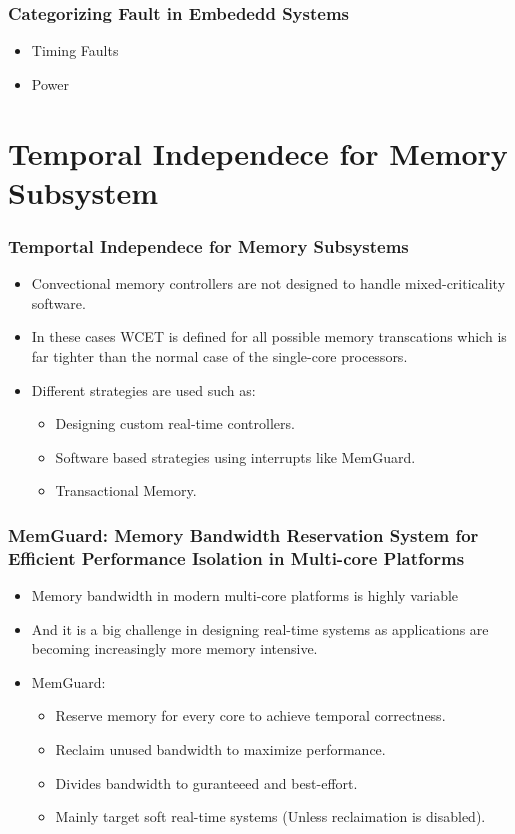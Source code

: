 \documentclass{beamer}
\begin{document}
\begin{frame}
    \frametitle{Categorizing Fault in Embededd Systems}
    \begin{itemize}
        \item Timing Faults
        \item Power
    \end{itemize}
\end{frame}
\section{Temporal Independece for Memory Subsystem}
\begin{frame}
    \frametitle{Temportal Independece for Memory Subsystems}
    \begin{itemize}
        \item Convectional memory controllers are not designed to handle
            mixed-criticality software.
        \item In these cases WCET is defined for all possible memory
            transcations which is far tighter than the normal case of the
            single-core processors.
        \item Different strategies are used such as:
            \begin{itemize}
                \item Designing custom real-time controllers.
                \item Software based strategies using interrupts like MemGuard.
                \item Transactional Memory.
            \end{itemize}
    \end{itemize}
\end{frame}
\begin{frame}
    \frametitle{MemGuard: Memory Bandwidth Reservation System for Efficient
    Performance Isolation in Multi-core Platforms}
    \begin{itemize}
        \item Memory bandwidth in modern multi-core platforms is highly
            variable
        \item And it is a big challenge in designing real-time systems as
            applications are becoming increasingly more memory intensive.
        \item MemGuard:
            \begin{itemize}
                \item Reserve memory for every core to achieve temporal
                    correctness.
                \item Reclaim unused bandwidth to maximize performance.
                \item Divides bandwidth to guranteeed and best-effort.
                \item Mainly target soft real-time systems
                    (Unless reclaimation is disabled).
            \end{itemize}
    \end{itemize}
\end{frame}
\end{document}
